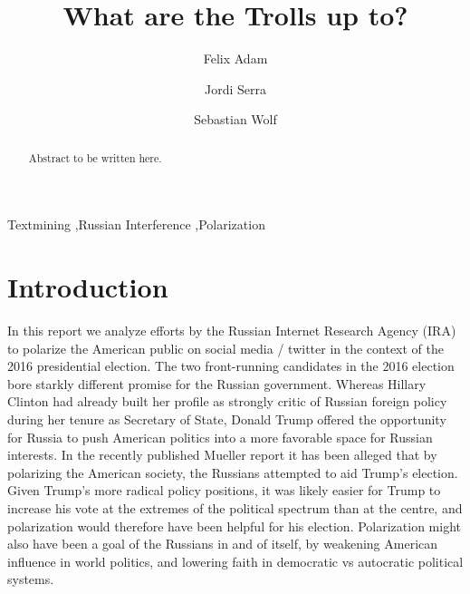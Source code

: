 \documentclass[12pt, authoryear]{elsarticle}
\begin{document}
\begin{frontmatter}  %

\title{What are the Trolls up to?}


\author[Add1]{Felix Adam}

\author[Add1]{Jordi Serra}

\author[Add1]{Sebastian Wolf}

\address[Add1]{Barcelona Graduate School of Economics, Barcelona, Spain}

\begin{abstract}
\small{
Abstract to be written here. 
}
\end{abstract}

\vspace{1cm}

\begin{keyword}
\footnotesize{
Textmining \sep Russian Interference \sep Polarization  \\ \vspace{0.3cm}
}
\end{keyword}
\vspace{0.5cm}
\end{frontmatter}

\headsep 35pt %
\section{Introduction}\label{intro}

In this report we analyze efforts by the Russian Internet Research Agency (IRA) to polarize the American public on social media / twitter in the context of the 2016 presidential election. The two front-running candidates in the 2016 election bore starkly different promise for the Russian government. Whereas Hillary Clinton had already built her profile as strongly critic of Russian foreign policy during her tenure as Secretary of State, Donald Trump offered the opportunity for Russia to push American politics into a more favorable space for Russian interests. In the recently published Mueller report it has been alleged that by polarizing the American society, the Russians attempted to aid Trump's election. Given Trump's more radical policy positions, it was likely easier for Trump to increase his vote at the extremes of the political spectrum than at the centre, and polarization would therefore have been helpful for his election. Polarization might also have been a goal of the Russians in and of itself, by weakening American influence in world politics, and lowering faith in democratic vs autocratic political systems.
\end{document}
